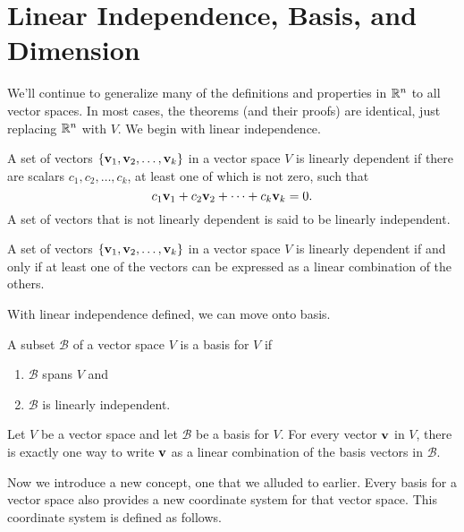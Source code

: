 \documentclass[../m73main.tex]{chapters}
\begin{document}
\section{Linear Independence, Basis, and Dimension}
We'll continue to generalize many of the definitions and properties in $\mathbb{R}^n$ to all vector spaces.
In most cases, the theorems (and their proofs) are identical, just replacing $\mathbb{R}^n$ with $V$.
We begin with linear independence.

\begin{definition}
	A set of vectors $\{\mathbf{v}_1, \mathbf{v}_2, \ldots, \mathbf{v}_k\}$ in a vector space $V$ is linearly dependent if there are scalars $c_1, c_2, \ldots, c_k$, at least one of which is not zero, such that
	\[ c_1 \mathbf{v}_1 + c_2 \mathbf{v}_2 + \cdots + c_k \mathbf{v}_k = 0. \]
	A set of vectors that is not linearly dependent is said to be linearly independent.
\end{definition}

\begin{theorem}
	A set of vectors $\{\mathbf{v}_1, \mathbf{v}_2, \ldots, \mathbf{v}_k\}$ in a vector space $V$ is linearly dependent if and only if at least one of the vectors can be expressed as a linear combination of the others.
\end{theorem}

With linear independence defined, we can move onto basis.

\begin{definition}[Basis]
	A subset $\mathcal{B}$ of a vector space $V$ is a basis for $V$ if
	\begin{enumerate}
		\item $\mathcal{B}$ spans $V$ and
		\item $\mathcal{B}$ is linearly independent.
	\end{enumerate}
\end{definition}

\begin{theorem}
	Let $V$ be a vector space and let $\mathcal{B}$ be a basis for $V$.
	For every vector $\mathbf{v}$ in $V$, there is exactly one way to write $\mathbf{v}$ as a linear combination of the basis vectors in $\mathcal{B}$.
\end{theorem}

Now we introduce a new concept, one that we alluded to earlier.
Every basis for a vector space also provides a new coordinate system for that vector space.
This coordinate system is defined as follows.
\end{document}

